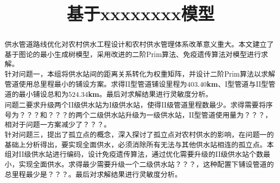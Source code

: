 \documentclass{whutmod}
\title{基于xxxxxxxx模型}
\begin{document}
	\maketitle
	\thispagestyle{empty}
	\begin{abstract}
		供水管道路线优化对农村供水工程设计和农村供水管理体系改革意义重大。本文建立了基于图论的最小生成树模型，采用改进的二阶Prim算法、免疫遗传算法对模型进行求解。
		\\
	
	    针对问题一，本组将供水站间的距离关系转化为权重矩阵，并设计二阶Prim算法以求解管道使用总里程最小的铺设方案。求得II型管道铺设里程为$\mathbf{403.40}$\textbf{km}、I型管道与II型管道的最小铺设总和为$\mathbf{524.34}$\textbf{km}。最后对求解结果进行灵敏度分析。
		\\
		
		问题二要求升级两个II级供水站为I级供水站，使得II级管道里程数最少。求得需要将序号为？？？和？？？的两个二级供水站升级为一级供水站，II型管道使用量为？？？，相对于问题一方案减少了？？？。
		\\
		
		针对问题三，提出了孤立点的概念，深入探讨了孤立点对农村供水的影响，在问题一的基础上分析得出，要实现全面供水，必须消除所有无法与其他供水站相连的孤立点。本组对II级供水站进行编码，设计免疫遗传算法，通过优化需要升级的II级供水站个数最小，实现全面供水。求得最少需要升级一个二级供水站？？？，这种配置下铺设管道的总里程最少是？？？。最后对求解结果进行灵敏度分析。
		\\
	

\end{abstract}
\end{document}
